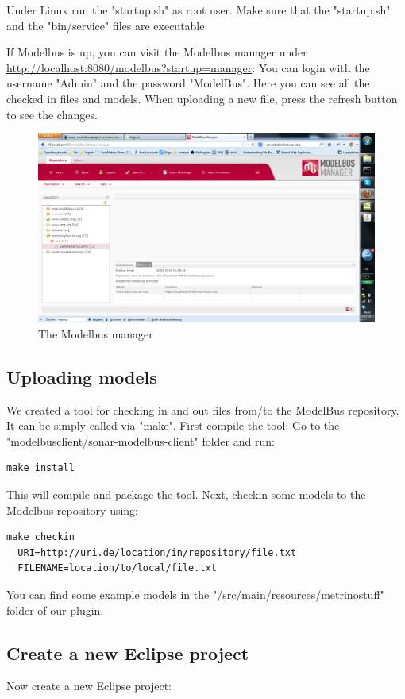 Under Linux run the "startup.sh" as root user. Make sure that the "startup.sh" and the "bin/service" files are executable.

If Modelbus is up, you can visit the Modelbus manager under \url{http://localhost:8080/modelbus?startup=manager}: You can login with the username "Admin" and the password "ModelBus". Here you can see all the checked in files and models. When uploading a new file, press the refresh button to see the changes.

\begin{figure}[h]
	\centering
		\includegraphics[width=\textwidth]{modelbusmanager}
	\caption{The Modelbus manager}
	\label{fig:modelbusmanager}
\end{figure}


\subsection{Uploading models}
We created a tool for checking in and out files from/to the ModelBus repository. It can be simply called via "make". First compile the tool: Go to the "modelbusclient/sonar-modelbus-client" folder and run:
\begin{verbatim}
make install
\end{verbatim}
This will compile and package the tool. Next, checkin some models to the Modelbus repository using:
\begin{verbatim}
make checkin 
  URI=http://uri.de/location/in/repository/file.txt 
  FILENAME=location/to/local/file.txt
\end{verbatim}
You can find some example models in the "/src/main/resources/metrinostuff" folder of our plugin.


\subsection{Create a new Eclipse project}
Now create a new Eclipse project:


